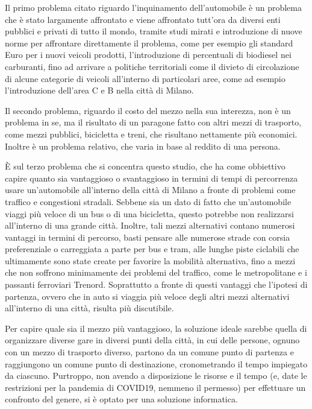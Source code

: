 Il primo problema citato riguardo l'inquinamento dell'automobile è un problema che è stato largamente affrontato e viene affrontato tutt'ora da diversi enti pubblici e privati di tutto il mondo, tramite studi mirati e introduzione di nuove norme per affrontare direttamente il problema, come per esempio gli standard Euro per i nuovi veicoli prodotti, l'introduzione di percentuali di biodiesel nei carburanti, fino ad arrivare a politiche territoriali come il divieto di circolazione di alcune categorie di veicoli all'interno di particolari aree, come ad esempio l'introduzione dell'area C e B nella città di Milano.

Il secondo problema, riguardo il costo del mezzo nella sua interezza, non è un problema in se, ma il risultato di un paragone fatto con altri mezzi di trasporto, come mezzi pubblici, bicicletta e treni, che risultano nettamente più economici. Inoltre è un problema relativo, che varia in base al reddito di una persona.

È sul terzo problema che si concentra questo studio, che ha come obbiettivo capire quanto sia vantaggioso o svantaggioso in termini di tempi di percorrenza usare un'automobile all'interno della città di Milano a fronte di problemi come traffico e congestioni stradali.
Sebbene sia un dato di fatto che un'automobile viaggi più veloce di un bus o di una bicicletta, questo potrebbe non realizzarsi all'interno di una grande città. Inoltre, tali mezzi alternativi contano numerosi vantaggi in termini di percorso, basti pensare alle numerose strade con corsia preferenziale o carreggiata a parte per bus e tram, alle lunghe piste ciclabili che ultimamente sono state create per favorire la mobilità alternativa, fino a mezzi che non soffrono minimamente dei problemi del traffico, come le metropolitane e i passanti ferroviari Trenord. Soprattutto a fronte di questi vantaggi che l'ipotesi di partenza, ovvero che in auto si viaggia più veloce degli altri mezzi alternativi all'interno di una città, risulta più discutibile.

Per capire quale sia il mezzo più vantaggioso, la soluzione ideale sarebbe quella di organizzare diverse gare in diversi punti della città, in cui delle persone, ognuno con un mezzo di trasporto diverso, partono da un comune punto di partenza e raggiungono un comune punto di destinazione, cronometrando il tempo impiegato da ciascuno. Purtroppo, non avendo a disposizione le risorse e il tempo (e, date le restrizioni per la pandemia di COVID19, nemmeno il permesso) per effettuare un confronto del genere, si è optato per una soluzione informatica.

